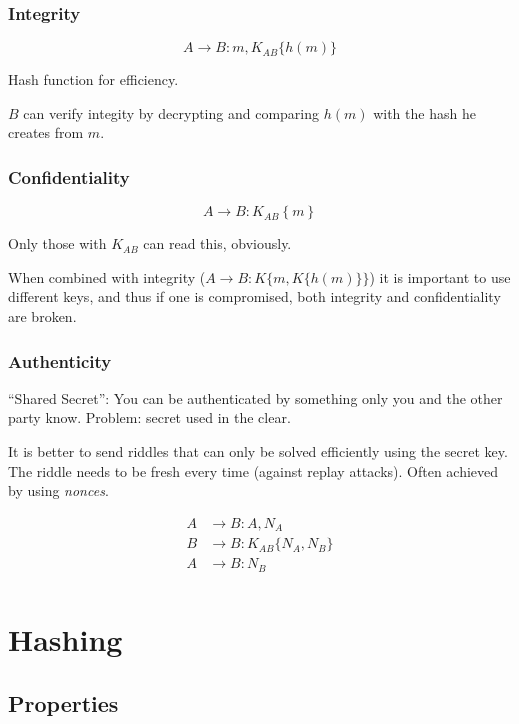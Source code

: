 \documentclass{article}
\begin{document}
\subsubsection{Integrity}

\[
  A \longrightarrow B : m, K_{AB}\{h(m)\}
\]

Hash function for efficiency.

$B$ can verify integity by decrypting and comparing $h(m)$ with the hash he
creates from $m$.

\subsubsection{Confidentiality}

\[ 
  A \longrightarrow B : K_{AB}\left\{ m \right\}
\]

Only those with $K_{AB}$ can read this, obviously.

When combined with integrity ($A \longrightarrow B : K\{m, K\{h(m)\}\}$) it is
important to use different keys, and thus if one is compromised, both integrity
and confidentiality are broken.

\subsubsection{Authenticity}

``Shared Secret'': You can be authenticated by something only you and the other
party know. Problem: secret used in the clear.

It is better to send riddles that can only be solved efficiently using the
secret key. The riddle needs to be fresh every time (against replay attacks).
Often achieved by using \emph{nonces}.

\begin{align*}
  A & \longrightarrow  B  : A, N_A             \\
  B & \longrightarrow  B : K_{AB}\{N_A, N_B\} \\
  A & \longrightarrow  B  : N_B                \\
\end{align*}

\section{Hashing}

\subsection{Properties}
\end{document}
